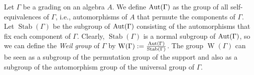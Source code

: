 \begin{defi}[\cite{PZ}]
	Let $\Gamma$ be a grading on an algebra $A$. We define $\operatorname{Aut}(\Gamma)$ as the group of all self-equivalences of $\Gamma$, i.e., automorphisms of $A$ that 
	permute the components of $\Gamma$. Let $\operatorname{Stab}(\Gamma)$ be the subgroup of $\operatorname{Aut}(\Gamma)$ consisting of the automorphisms that fix 
	each component of $\Gamma$. Clearly, $\operatorname{Stab}(\Gamma)$ is a normal subgroup of $\operatorname{Aut}(\Gamma)$, so we can define the \emph{Weil group} of 
	$\Gamma$ by $\operatorname W (\Gamma) := \frac{\operatorname{Aut}(\Gamma)}{\operatorname{Stab}(\Gamma)}$. The group $\operatorname W (\Gamma)$ can be seen as a subgroup
	of the permutation group of the support and also as a subgroup of the automorphism group of the universal group of $\Gamma$.
\end{defi}







